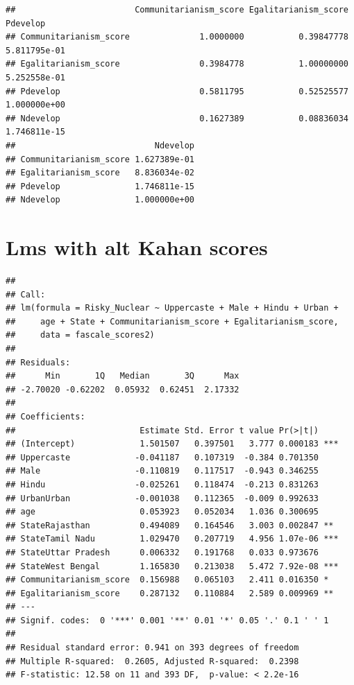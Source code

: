 \documentclass[
]{article}
\begin{document}
\begin{verbatim}
##                        Communitarianism_score Egalitarianism_score     Pdevelop
## Communitarianism_score              1.0000000           0.39847778 5.811795e-01
## Egalitarianism_score                0.3984778           1.00000000 5.252558e-01
## Pdevelop                            0.5811795           0.52525577 1.000000e+00
## Ndevelop                            0.1627389           0.08836034 1.746811e-15
##                            Ndevelop
## Communitarianism_score 1.627389e-01
## Egalitarianism_score   8.836034e-02
## Pdevelop               1.746811e-15
## Ndevelop               1.000000e+00
\end{verbatim}

\hypertarget{lms-with-alt-kahan-scores}{%
\section{Lms with alt Kahan scores}\label{lms-with-alt-kahan-scores}}

\begin{verbatim}
## 
## Call:
## lm(formula = Risky_Nuclear ~ Uppercaste + Male + Hindu + Urban + 
##     age + State + Communitarianism_score + Egalitarianism_score, 
##     data = fascale_scores2)
## 
## Residuals:
##      Min       1Q   Median       3Q      Max 
## -2.70020 -0.62202  0.05932  0.62451  2.17332 
## 
## Coefficients:
##                         Estimate Std. Error t value Pr(>|t|)    
## (Intercept)             1.501507   0.397501   3.777 0.000183 ***
## Uppercaste             -0.041187   0.107319  -0.384 0.701350    
## Male                   -0.110819   0.117517  -0.943 0.346255    
## Hindu                  -0.025261   0.118474  -0.213 0.831263    
## UrbanUrban             -0.001038   0.112365  -0.009 0.992633    
## age                     0.053923   0.052034   1.036 0.300695    
## StateRajasthan          0.494089   0.164546   3.003 0.002847 ** 
## StateTamil Nadu         1.029470   0.207719   4.956 1.07e-06 ***
## StateUttar Pradesh      0.006332   0.191768   0.033 0.973676    
## StateWest Bengal        1.165830   0.213038   5.472 7.92e-08 ***
## Communitarianism_score  0.156988   0.065103   2.411 0.016350 *  
## Egalitarianism_score    0.287132   0.110884   2.589 0.009969 ** 
## ---
## Signif. codes:  0 '***' 0.001 '**' 0.01 '*' 0.05 '.' 0.1 ' ' 1
## 
## Residual standard error: 0.941 on 393 degrees of freedom
## Multiple R-squared:  0.2605, Adjusted R-squared:  0.2398 
## F-statistic: 12.58 on 11 and 393 DF,  p-value: < 2.2e-16
\end{verbatim}
\end{document}
